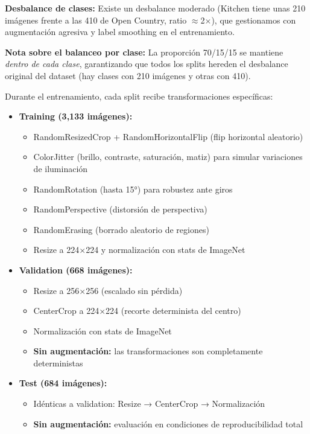 \documentclass[11pt,a4paper]{article}
\begin{document}
\textbf{Desbalance de clases:} Existe un desbalance moderado (Kitchen tiene unas 210 imágenes frente a las 410 de Open Country, ratio $\approx$2$\times$), que gestionamos con augmentación agresiva y label smoothing en el entrenamiento.

\textbf{Nota sobre el balanceo por clase:} La proporción 70/15/15 se mantiene \textit{dentro de cada clase}, garantizando que todos los splits hereden el desbalance original del dataset (hay clases con 210 imágenes y otras con 410).



Durante el entrenamiento, cada split recibe transformaciones específicas:

\begin{itemize}
    \item \textbf{Training (3,133 imágenes):}
    \begin{itemize}
        \item RandomResizedCrop + RandomHorizontalFlip (flip horizontal aleatorio)
        \item ColorJitter (brillo, contraste, saturación, matiz) para simular variaciones de iluminación
        \item RandomRotation (hasta 15°) para robustez ante giros
        \item RandomPerspective (distorsión de perspectiva)
        \item RandomErasing (borrado aleatorio de regiones)
        \item Resize a 224×224 y normalización con stats de ImageNet
    \end{itemize}
    
    \item \textbf{Validation (668 imágenes):}
    \begin{itemize}
        \item Resize a 256×256 (escalado sin pérdida)
        \item CenterCrop a 224×224 (recorte determinista del centro)
        \item Normalización con stats de ImageNet
        \item \textbf{Sin augmentación:} las transformaciones son completamente deterministas
    \end{itemize}
    
    \item \textbf{Test (684 imágenes):}
    \begin{itemize}
        \item Idénticas a validation: Resize → CenterCrop → Normalización
        \item \textbf{Sin augmentación:} evaluación en condiciones de reproducibilidad total
    \end{itemize}
\end{itemize}
\end{document}
